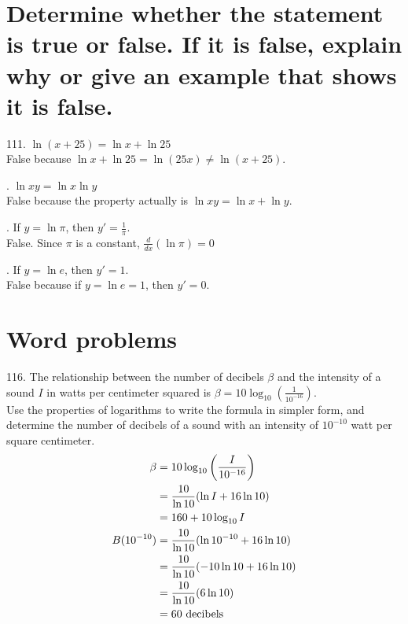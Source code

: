 \documentclass[11pt]{article}
\newcommand*{\vs}{\vspace{1cm}}
\newcommand*{\next}{\noindent}
\newcommand*{\set}{\setcounter{equation}{0}}
\newcommand*{\lt}{\left}
\newcommand*{\rt}{\right}
\begin{document}
\section{Determine whether the
statement is true or false. If it is false, explain why or give an
example that shows it is false.}
111. $\ln(x+25)=\ln x+\ln 25$\\
\indent False because $\ln x+\ln 25=\ln(25x)\neq\ln(x+25)$.

\vs\next
112. $\ln xy=\ln x\ln y$\\
\indent False because the property actually is $\ln xy=\ln x+\ln y$.

\vs\next
113. If $y=\ln\pi$, then $y'=\frac{1}{\pi}$.\\
\indent False. Since $\pi$ is a constant, $\frac{d}{dx}(\ln\pi)=0$

\vs\next
114. If $y=\ln e$, then $y'=1$.\\
\indent False because if $y=\ln e=1$, then $y'=0$.

\section{Word problems}
116. The relationship between the number of
decibels $\beta$ and the intensity of a sound $I$ in watts per
centimeter squared is $\beta=10\log_{10}\lt(\frac{1}{10^{-16}}\rt)$.\\
Use the properties of logarithms to write the formula in
simpler form, and determine the number of decibels of a
sound with an intensity of $10^{-10}$ watt per square centimeter.\\
\begin{align}
    \set
    \beta&=10\log_{10}\lt(\frac{I}{10^{-16}}\rt)\\
    &=\frac{10}{\ln 10}(\ln I+16\ln 10)\\
    &=160+10\log_{10}I\\
    B(10^{-10})&=\frac{10}{\ln 10}(\ln 10^{-10}+16\ln 10)\\
    &=\frac{10}{\ln 10}(-10\ln 10+16\ln 10)\\
    &=\frac{10}{\ln 10}(6\ln 10)\\
    &=60\,\,\text{decibels}
\end{align}
\end{document}
